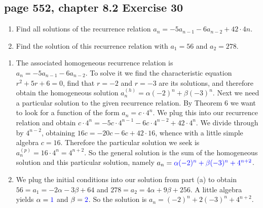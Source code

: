 \documentclass[sigconf]{acmart}
\newcommand{\answer}[2]{%
  \if\relax\detokenize{#2}\relax
    \underline{\mbox{請作答}}%
  \else
    \textcolor{blue}{#2}%
  \fi
}
\begin{document}
\subsection{page 552, chapter 8.2 Exercise 30}
\begin{shaded}
    \begin{enumerate}[label=(\alph*)]
        \item Find all solutions of the recurrence relation $a_n = -5a_{n-1} - 6a_{n-2} + 42 \cdot 4n$.
        \item Find the solution of this recurrence relation with $a_1 = 56$ and $a_2 = 278$.
    \end{enumerate}
\end{shaded}
\begin{enumerate}[label=(\alph*)]
        \item The associated homogeneous recurrence relation is \\
        $a_n = -5a_{n-1} - 6a_{n-2}$. To solve it we find the characteristic equation $r^2 + 5r + 6 = 0$, find that $r = -2$ and $r = -3$ are its solutions, and therefore obtain the homogeneous solution $a_n^{(h)} = \alpha(-2)^n + \beta(-3)^n$. Next we need a particular solution to the given recurrence relation. By Theorem 6 we want to look for a function of the form $a_n = c\cdot4^n$. We plug this into our recurrence relation and obtain $c\cdot4^n = -5c\cdot4^{n-1} - 6c\cdot4^{n-2} + 42\cdot4^n$. We divide through by $4^{n-2}$, obtaining $16c = -20c - 6c + 42\cdot16$, whence with a little simple algebra $c = 16$. Therefore the particular solution we seek is $a_n^{(p)} = 16\cdot4^n = 4^{n+2}$. So the general solution is the sum of the homogeneous solution and this particular solution, namely $a_n = \answer{8.2.30a}{\alpha(-2)^n + \beta(-3)^n + 4^{n+2}}$.
        \item We plug the initial conditions into our solution from part (a) to obtain $56 = a_1 = -2\alpha - 3\beta + 64$ and $278 = a_2 = 4\alpha + 9\beta + 256$. A little algebra yields $\alpha = \answer{8.2.30b}{1}$ and $\beta = \answer{8.2.30c}{2}$. So the solution is $a_n = (-2)^n + 2(-3)^n + 4^{n+2}$.
\end{enumerate}
\end{document}
